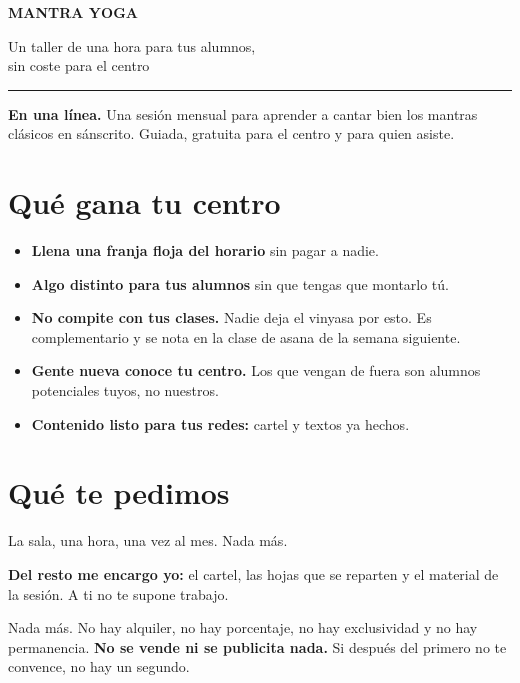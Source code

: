 \documentclass[11pt,a4paper]{article}
\newcommand{\caja}[1]{%
  \par\medskip
  \noindent\colorbox{grisclaro}{%
    \begin{minipage}{\dimexpr\textwidth-2\fboxsep}
      \vspace{0.4em}#1\vspace{0.4em}
    \end{minipage}}%
  \par\medskip}
\begin{document}

{\titular\bfseries\fontsize{30}{34}\selectfont MANTRA YOGA\par}
\vspace{0.2em}
{\titular\fontsize{13}{16}\selectfont\color{gris} Un taller de una hora para tus alumnos,\\ sin coste para el centro\par}

\vspace{0.7em}
{\color{ocre}\rule{\textwidth}{1.6pt}}

\caja{\textbf{En una línea.} Una sesión mensual para aprender a cantar bien los
mantras clásicos en sánscrito. Guiada, gratuita para el centro y para quien
asiste.}

\section{Qué gana tu centro}

\begin{itemize}
  \item \textbf{Llena una franja floja del horario} sin pagar a nadie.
  \item \textbf{Algo distinto para tus alumnos} sin que tengas que montarlo tú.
  \item \textbf{No compite con tus clases.} Nadie deja el vinyasa por esto. Es
        complementario y se nota en la clase de asana de la semana siguiente.
  \item \textbf{Gente nueva conoce tu centro.} Los que vengan de fuera son
        alumnos potenciales tuyos, no nuestros.
  \item \textbf{Contenido listo para tus redes:} cartel y textos ya hechos.
\end{itemize}

\section{Qué te pedimos}

La sala, una hora, una vez al mes. Nada más.

\textbf{Del resto me encargo yo:} el cartel, las hojas que se reparten y el
material de la sesión. A ti no te supone trabajo.

Nada más. No hay alquiler, no hay porcentaje, no hay exclusividad y no hay
permanencia. \textbf{No se vende ni se publicita nada.} Si después del primero
no te convence, no hay un segundo.
\end{document}
